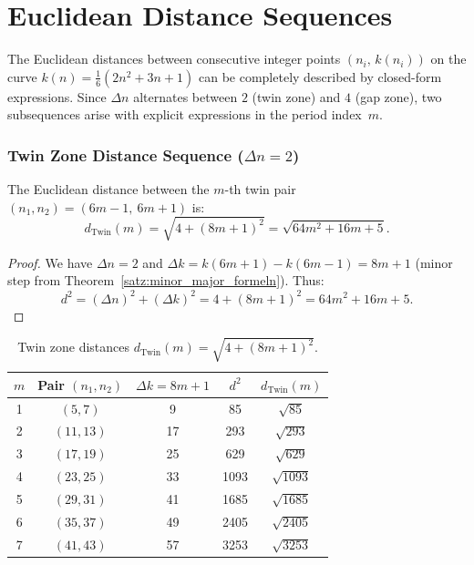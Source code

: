 \chapter{Euclidean Distance Sequences}
\label{sec:distanz_sequenzen}

The Euclidean distances between consecutive integer points
$(n_i,\, k(n_i))$ on the curve $k(n) = \frac{1}{6}(2n^2+3n+1)$ can be
completely described by closed-form expressions. Since $\Delta n$ alternates
between $2$ (twin zone) and $4$ (gap zone), two subsequences arise
with explicit expressions in the period index~$m$.

\subsection{Twin Zone Distance Sequence (\texorpdfstring{$\Delta n = 2$}{Δn=2})}

\begin{satz}
\label{satz:twin_distanz}
The Euclidean distance between the $m$-th twin pair
$(n_1, n_2) = (6m-1,\ 6m+1)$ is:
\begin{equation}
  \boxed{
  d_{\mathrm{Twin}}(m)
  = \sqrt{4 + (8m+1)^2}
  = \sqrt{64m^2 + 16m + 5}.
  }
\end{equation}
\end{satz}

\begin{proof}
We have $\Delta n = 2$ and $\Delta k = k(6m+1)-k(6m-1) = 8m+1$
(minor step from Theorem~\ref{satz:minor_major_formeln}). Thus:
\[
  d^2 = (\Delta n)^2 + (\Delta k)^2
      = 4 + (8m+1)^2
      = 64m^2+16m+5.
\]
\end{proof}

\begin{table}[H]
\centering
\caption{Twin zone distances $d_{\mathrm{Twin}}(m) = \sqrt{4+(8m+1)^2}$.}
\renewcommand{\arraystretch}{1.15}
\begin{tabular}{ccccc}
\toprule
$m$ & Pair $(n_1, n_2)$ & $\Delta k = 8m+1$ & $d^2$ & $d_{\mathrm{Twin}}(m)$ \\
\midrule
1 & $( 5,  7)$ &  9 &   85 & $\sqrt{85}$   \\
2 & $(11, 13)$ & 17 &  293 & $\sqrt{293}$  \\
3 & $(17, 19)$ & 25 &  629 & $\sqrt{629}$  \\
4 & $(23, 25)$ & 33 & 1093 & $\sqrt{1093}$ \\
5 & $(29, 31)$ & 41 & 1685 & $\sqrt{1685}$ \\
6 & $(35, 37)$ & 49 & 2405 & $\sqrt{2405}$ \\
7 & $(41, 43)$ & 57 & 3253 & $\sqrt{3253}$ \\
\bottomrule
\end{tabular}
\end{table}

